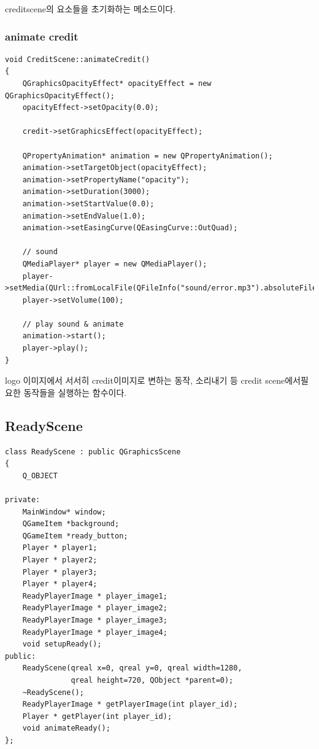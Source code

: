 \documentclass[10pt,oneside,a4paper,titlepage]{article}
\begin{document}
creditscene의 요소들을 초기화하는 메소드이다.

\subsubsection{animate credit}


\begin{lstlisting}
void CreditScene::animateCredit()
{
    QGraphicsOpacityEffect* opacityEffect = new QGraphicsOpacityEffect();
    opacityEffect->setOpacity(0.0);

    credit->setGraphicsEffect(opacityEffect);

    QPropertyAnimation* animation = new QPropertyAnimation();
    animation->setTargetObject(opacityEffect);
    animation->setPropertyName("opacity");
    animation->setDuration(3000);
    animation->setStartValue(0.0);
    animation->setEndValue(1.0);
    animation->setEasingCurve(QEasingCurve::OutQuad);

    // sound
    QMediaPlayer* player = new QMediaPlayer();
    player->setMedia(QUrl::fromLocalFile(QFileInfo("sound/error.mp3").absoluteFilePath()));
    player->setVolume(100);
    
    // play sound & animate
    animation->start();
    player->play();
}
\end{lstlisting}

logo 이미지에서 서서히 credit이미지로 변하는 동작, 소리내기 등 credit scene에서필요한 동작들을 실행하는 함수이다.\\

\subsection{ReadyScene}
\begin{lstlisting}
class ReadyScene : public QGraphicsScene
{
    Q_OBJECT

private:
    MainWindow* window;
    QGameItem *background;
    QGameItem *ready_button;
    Player * player1;
    Player * player2;
    Player * player3;
    Player * player4;
    ReadyPlayerImage * player_image1;
    ReadyPlayerImage * player_image2;
    ReadyPlayerImage * player_image3;
    ReadyPlayerImage * player_image4;
    void setupReady();
public:
    ReadyScene(qreal x=0, qreal y=0, qreal width=1280,
               qreal height=720, QObject *parent=0);
    ~ReadyScene();
    ReadyPlayerImage * getPlayerImage(int player_id);
    Player * getPlayer(int player_id);
    void animateReady();
};
\end{lstlisting}
\end{document}
